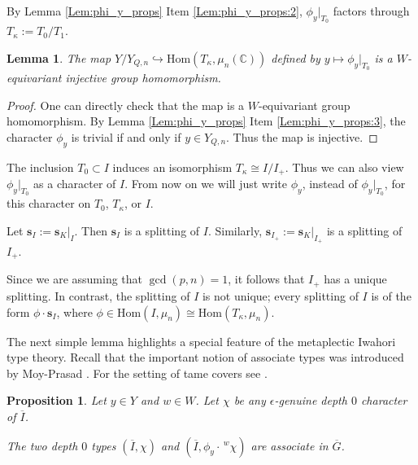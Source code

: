 \documentclass[11pt]{amsart}
\theoremstyle{plain}
\newtheorem{Prop}[equation]{Proposition}
\newtheorem{Lem}[equation]{Lemma}
\theoremstyle{definition}
\numberwithin{equation}{section}
\newcommand{\C}{\mathbb{C}}
\newcommand{\Gt}{\overline{G}}
\newcommand{\It}{\overline{I}}
\newcommand{\Yt}{Y_{Q,n}}
\newcommand{\s}{\mathbf{s}}
\begin{document}
By Lemma \ref{Lem:phi_y_props} Item \eqref{Lem:phi_y_props:2}, $\phi_{y}|_{T_{0}}$ factors through $T_{\kappa}:=T_{0}/T_{1}$. 

\begin{Lem}\label{Lem:Char_equi}
    The map $Y/\Yt\hookrightarrow\mathrm{Hom}(T_{\kappa},\mu_{n}(\C))$ defined by $y\mapsto \phi_{y}|_{T_{0}}$ is a $W$-equivariant injective group homomorphism.

\end{Lem}

\begin{proof}
    One can directly check that the map is a $W$-equivariant group homomorphism. By Lemma \ref{Lem:phi_y_props} Item \eqref{Lem:phi_y_props:3}, the character $\phi_{y}$ is trivial if and only if $y\in \Yt$. Thus the map is injective.
\end{proof}

The inclusion $T_{0}\subset I$ induces an isomorphism $T_{\kappa}\cong I/I_{+}$. Thus we can also view $\phi_{y}|_{T_{0}}$ as a character of $I$. From now on we will just write $\phi_{y}$, instead of $\phi_{y}|_{T_{0}}$, for this character on $T_{0}$, $T_{\kappa}$, or $I$.

Let $\s_{I}:=\s_{K}|_{I}$. Then $\s_{I}$ is a splitting of $I$. Similarly, $\s_{I_{+}}:=\s_{K}|_{I_{+}}$ is a splitting of $I_{+}$. 

Since we are assuming that $\gcd(p,n)=1$, it follows that $I_{+}$ has a unique splitting. In contrast, the splitting of $I$ is not unique; every splitting of $I$ is of the form $\phi\cdot \s_{I}$, where $\phi\in\mathrm{Hom}(I,\mu_{n})\cong \mathrm{Hom}(T_{\kappa},\mu_{n})$. 


The next simple lemma highlights a special feature of the metaplectic Iwahori type theory. Recall that the important notion of associate types was introduced by Moy-Prasad \cite{MP94}. For the setting of tame covers see \cite[Definition 3.4]{HW09}. 

\begin{Prop}\label{Prop:Y_type_action}
    Let $y\in Y$ and $w\in W$. Let $\chi$ be any $\epsilon$-genuine depth $0$ character of $\It$.
    
    The two depth $0$ types $(\It,\chi)$ and $(\It,\phi_{y}\cdot \,^{w}\chi)$ are associate in $\Gt$.
\end{Prop}
\end{document}
